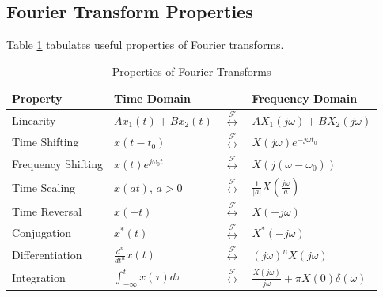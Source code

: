 \subsection{Fourier Transform Properties}

Table \ref{tab:fourier_transform_properties} tabulates
useful properties of Fourier transforms.

\begin{table}[ht]
    \centering
    \caption{Properties of Fourier Transforms}
    \label{tab:fourier_transform_properties}
    \begin{tabular}{llll}
        \toprule
        \textbf{Property}  & \textbf{Time Domain}                &                                          & \textbf{Frequency Domain}                                     \\
        \midrule
        Linearity          & $A x_1(t) + B x_2(t)$               & $\overset{\mathcal{F}}{\leftrightarrow}$ & $A X_1(j\omega) + B X_2(j\omega)$                             \\[1mm]
        Time Shifting      & $x(t - t_0)$                        & $\overset{\mathcal{F}}{\leftrightarrow}$ & $X(j\omega)e^{-j\omega t_0}$                                  \\[1mm]
        Frequency Shifting & $x(t)e^{j\omega_0 t}$               & $\overset{\mathcal{F}}{\leftrightarrow}$ & $X(j(\omega - \omega_0))$                                     \\[1mm]
        Time Scaling       & $x(at)$, $a > 0$                    & $\overset{\mathcal{F}}{\leftrightarrow}$ & $\frac{1}{|a|}X\left(\frac{j\omega}{a}\right)$                \\[1mm]
        Time Reversal      & $x(-t)$                             & $\overset{\mathcal{F}}{\leftrightarrow}$ & $X(-j\omega)$                                                 \\[1mm]
        Conjugation        & $x^*(t)$                            & $\overset{\mathcal{F}}{\leftrightarrow}$ & $X^*(-j\omega)$                                               \\[1mm]
        Differentiation    & $\frac{d^n}{dt^n}x(t)$              & $\overset{\mathcal{F}}{\leftrightarrow}$ & $(j\omega)^n X(j\omega)$                                      \\[1mm]
        Integration        & $\int_{-\infty}^t x(\tau) d\tau$    & $\overset{\mathcal{F}}{\leftrightarrow}$ & $\frac{X(j\omega)}{j\omega} + \pi X(0)\delta(\omega)$         \\[1mm]

\end{tabular}
\end{table}
